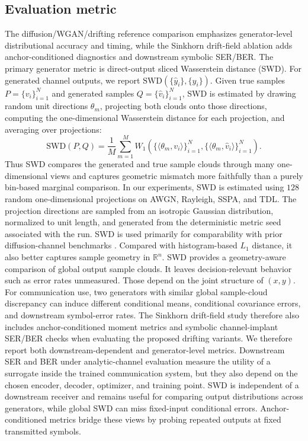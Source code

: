 \documentclass[10pt,journal]{IEEEtran}
\begin{document}
\subsection{Evaluation metric}
The diffusion/WGAN/drifting reference comparison emphasizes generator-level distributional accuracy and timing, while the Sinkhorn drift-field ablation adds anchor-conditioned diagnostics and downstream symbolic SER/BER.
The primary generator metric is direct-output sliced Wasserstein distance (SWD).
For generated channel outputs, we report \(\mathrm{SWD}\!\left(\{\hat{y}_i\}, \{y_i\}\right)\).
Given true samples \(P=\{v_i\}_{i=1}^N\) and generated samples \(Q=\{\hat v_i\}_{i=1}^N\), SWD is estimated by drawing random unit directions \(\theta_m\), projecting both clouds onto those directions, computing the one-dimensional Wasserstein distance for each projection, and averaging over projections:
\begin{equation*}
\mathrm{SWD}(P,Q)
=
\frac{1}{M}
\sum_{m=1}^M
W_1\!\left(\{\langle \theta_m,v_i\rangle\}_{i=1}^N,\{\langle \theta_m,\hat v_i\rangle\}_{i=1}^N\right).
\end{equation*}
Thus SWD compares the generated and true sample clouds through many one-dimensional views and captures geometric mismatch more faithfully than a purely bin-based marginal comparison. In our experiments, SWD is estimated using \(128\) random one-dimensional projections on AWGN,
  Rayleigh, SSPA, and TDL.
The projection directions are sampled from an isotropic Gaussian distribution, normalized to unit length, and generated from the deterministic metric seed associated with the run.
SWD is used primarily for comparability with prior diffusion-channel benchmarks \cite{paper2309,kimicc2024}. Compared with histogram-based \(L_1\) distance, it also better captures sample geometry in \(\mathbb{R}^n\).
SWD provides a geometry-aware comparison of global output sample clouds.
It leaves decision-relevant behavior such as error rates unmeasured.
Those depend on the joint structure of \((x,y)\).
For communication use, two generators with similar global sample-cloud discrepancy can induce different conditional means, conditional covariance errors, and downstream symbol-error rates.
The Sinkhorn drift-field study therefore also includes anchor-conditioned moment metrics and symbolic channel-implant SER/BER checks when evaluating the proposed drifting variants.
We therefore report both downstream-dependent and generator-level metrics.
Downstream SER and BER under analytic-channel evaluation measure the utility of a surrogate inside the trained communication system, but they also depend on the chosen encoder, decoder, optimizer, and training point.
SWD is independent of a downstream receiver and remains useful for comparing output distributions across generators, while global SWD can miss fixed-input conditional errors.
Anchor-conditioned metrics bridge these views by probing repeated outputs at fixed transmitted symbols.
\end{document}
